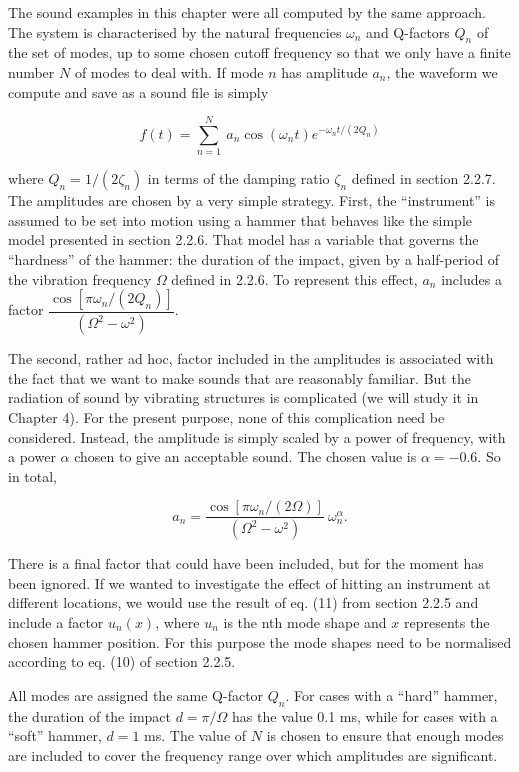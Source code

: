   The sound examples in this chapter were all computed by the same approach. 
  The system is characterised by the natural frequencies $\omega_n$ and 
  Q-factors $Q_n$ of the set of modes, up to some chosen cutoff frequency so 
  that we only have a finite number $N$ of modes to deal with. If mode $n$ has 
  amplitude $a_n$, the waveform we compute and save as a sound file is simply 

  \begin{equation*}f(t)=\sum_{n=1}^N~a_n \cos(\omega_n t) e^{-\omega_n t /(2 
  Q_n)} \tag{1}\end{equation*} 

  \noindent{}where $Q_n = 1/(2\zeta_n)$ in terms of the damping ratio $\zeta_n$ 
  defined in section 2.2.7. The amplitudes are chosen by a very simple 
  strategy. First, the ``instrument'' is assumed to be set into motion using a 
  hammer that behaves like the simple model presented in section 2.2.6. That 
  model has a variable that governs the ``hardness'' of the hammer: the 
  duration of the impact, given by a half-period of the vibration frequency 
  $\Omega$ defined in 2.2.6. To represent this effect, $a_n$ includes a factor 
  $\dfrac{\cos[\pi \omega_n/(2 Q_n)]}{(\Omega^2-\omega^2)}$. 

  The second, rather ad hoc, factor included in the amplitudes is associated 
  with the fact that we want to make sounds that are reasonably familiar. But 
  the radiation of sound by vibrating structures is complicated (we will study 
  it in Chapter 4). For the present purpose, none of this complication need be 
  considered. Instead, the amplitude is simply scaled by a power of frequency, 
  with a power $\alpha$ chosen to give an acceptable sound. The chosen value is 
  $\alpha = -0.6$. So in total, 

  \begin{equation*}a_n=\dfrac{\cos[\pi \omega_n/(2 
  \Omega)]}{(\Omega^2-\omega^2)}~\omega_n^\alpha.\tag{2}\end{equation*} 

  There is a final factor that could have been included, but for the moment has 
  been ignored. If we wanted to investigate the effect of hitting an instrument 
  at different locations, we would use the result of eq. (11) from section 
  2.2.5 and include a factor $u_n(x)$, where $u_n$ is the nth mode shape and 
  $x$ represents the chosen hammer position. For this purpose the mode shapes 
  need to be normalised according to eq. (10) of section 2.2.5. 

  All modes are assigned the same Q-factor $Q_n$. For cases with a ``hard'' 
  hammer, the duration of the impact $d=\pi / \Omega$ has the value 0.1 ms, 
  while for cases with a ``soft'' hammer, $d=1$ ms. The value of $N$ is chosen 
  to ensure that enough modes are included to cover the frequency range over 
  which amplitudes are significant. 